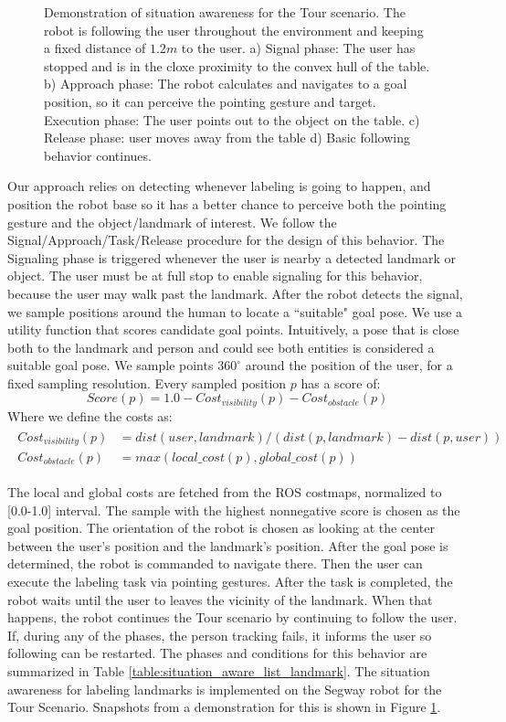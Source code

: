 \begin{figure}[ht!]
{        }
    \caption{Demonstration of situation awareness for the Tour scenario. The robot is following the user throughout the environment and keeping a fixed distance of $1.2m$ to the user. a) Signal phase: The user has stopped and is in the cloxe proximity to the convex hull of the table. b) Approach phase: The robot calculates and navigates to a goal position, so it can perceive the pointing gesture and target. Execution phase: The user points out to the object on the table. c) Release phase: user moves away from the table d) Basic following behavior continues.}
   \label{fig:situtation_aware_landmark_labeling}
\end{figure}

Our approach relies on detecting whenever labeling is going to happen, and position the robot base so it has a better chance to perceive both the pointing gesture and the object/landmark of interest. We follow the Signal/Approach/Task/Release procedure for the design of this behavior. The Signaling phase is triggered whenever the user is nearby a detected landmark or object. The user must be at full stop to enable signaling for this behavior, because the user may walk past the landmark. After the robot detects the signal, we sample positions around the human to locate a ``suitable" goal pose. We use a utility function that scores candidate goal points. Intuitively, a pose that is close both to the landmark and person and could see both entities is considered a suitable goal pose. We sample points $360^{\circ}$ around the position of the user, for a fixed sampling resolution. Every sampled position $p$ has a score of:
\[
Score(p) = 1.0 - Cost_{visibility}(p) - Cost_{obstacle}(p)
\]
Where we define the costs as:
\begin{align} 
\begin{split} 
Cost_{visibility}(p)&=dist(user,landmark)/(dist(p,landmark)-dist(p,user)) \\
Cost_{obstacle}(p)&=max( local\_cost(p),global\_cost(p))
\end{split} 
\end{align}



The local and global costs are fetched from the ROS costmaps, normalized to [0.0-1.0] interval. The sample with the highest nonnegative score is chosen as the goal position. The orientation of the robot is chosen as looking at the center between the user's position and the landmark's position. After the goal pose is determined, the robot is commanded to navigate there. Then the user can execute the labeling task via pointing gestures. After the task is completed, the robot waits until the user to leaves the vicinity of the landmark. When that happens, the robot continues the Tour scenario by continuing to follow the user. If, during any of the phases, the person tracking fails, it informs the user so following can be restarted. The phases and conditions for this behavior are summarized in Table \ref{table:situation_aware_list_landmark}. The situation awareness for labeling landmarks is implemented on the Segway robot for the Tour Scenario. Snapshots from a demonstration for this is shown in Figure \ref{fig:situtation_aware_landmark_labeling}.

